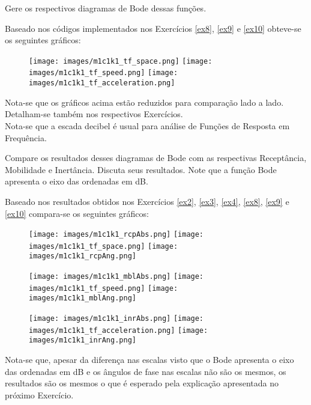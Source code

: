 \documentclass{article}
\begin{document}
\newpage
\begin{exercise}\label{ex11}
    Gere os respectivos diagramas de Bode dessas funções.
\end{exercise}
\begin{resolution}
    Baseado nos códigos implementados nos Exercícios \ref{ex8}, \ref{ex9} e \ref{ex10} obteve-se os seguintes gráficos:
    \begin{figure}[H]
        \centering
        \texttt{[image: images/m1c1k1\_tf\_space.png]}
        \texttt{[image: images/m1c1k1\_tf\_speed.png]}
        \texttt{[image: images/m1c1k1\_tf\_acceleration.png]}
    \end{figure}
    Nota-se que os gráficos acima estão reduzidos para comparação lado a lado. Detalham-se também nos respectivos Exercícios.\\

    Nota-se que a escada decibel é usual para análise de Funções de Resposta em Frequência.
\end{resolution}

\newpage
\begin{exercise}\label{ex12}
    Compare os resultados desses diagramas de Bode com as respectivas Receptância, Mobilidade e Inertância. Discuta seus resultados. Note que a função Bode apresenta o eixo das ordenadas em dB. 
\end{exercise}
\begin{resolution}
    Baseado nos resultados obtidos nos Exercícios \ref{ex2}, \ref{ex3}, \ref{ex4}, \ref{ex8}, \ref{ex9} e \ref{ex10} compara-se os seguintes gráficos: 
    \begin{figure}[H]
        \centering
        \texttt{[image: images/m1c1k1\_rcpAbs.png]}
        \texttt{[image: images/m1c1k1\_tf\_space.png]}
        \texttt{[image: images/m1c1k1\_rcpAng.png]}
    \end{figure}
    \begin{figure}[H]
        \centering
        \texttt{[image: images/m1c1k1\_mblAbs.png]}
        \texttt{[image: images/m1c1k1\_tf\_speed.png]}
        \texttt{[image: images/m1c1k1\_mblAng.png]}
    \end{figure}
    \begin{figure}[H]
        \centering
        \texttt{[image: images/m1c1k1\_inrAbs.png]}
        \texttt{[image: images/m1c1k1\_tf\_acceleration.png]}
        \texttt{[image: images/m1c1k1\_inrAng.png]}
    \end{figure}
    Nota-se que, apesar da diferença nas escalas visto que o Bode apresenta o eixo das ordenadas em dB e os ângulos de fase nas escalas não são os mesmos, os resultados são os mesmos o que é esperado pela explicação apresentada no próximo Exercício.
\end{resolution}
\end{document}

